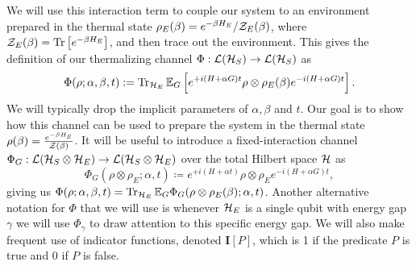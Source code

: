 We will use this interaction term to couple our system to an environment prepared in the thermal state $\rho_E(\beta) = e^{-\beta H_E} /\mathcal{Z}_E(\beta)$, where $\mathcal{Z}_E(\beta) = \operatorname{Tr} \left[  e^{-\beta H_E}  \right]$, and then trace out the environment. This gives the definition of our thermalizing channel $\Phi : \mathcal{L}(\mathcal{H}_S) \to \mathcal{L}(\mathcal{H}_S)$ as
\begin{equation}\label{eq:PhiDef}
    \Phi(\rho ; \alpha, \beta, t) :=  \operatorname{Tr}_{\mathcal{H}_E} \mathbb{E}_{G} \left[ e^{+i(H + \alpha G)t} \rho \otimes \rho_E(\beta) e^{-i(H + \alpha G) t}\right]. 
\end{equation}
We will typically drop the implicit parameters of $\alpha, \beta$ and $t$. Our goal is to show how this channel can be used to prepare the system in the thermal state $\rho(\beta) = \frac{e^{-\beta H_S}}{\mathcal{Z}(\beta)}$. It will be useful to introduce a fixed-interaction channel $\Phi_G : \mathcal{L}(\mathcal{H}_S \otimes \mathcal{H}_E) \to \mathcal{L}(\mathcal{H}_S \otimes \mathcal{H}_E)$ over the total Hilbert space $\mathcal{H}$ as 
\begin{equation}
    \Phi_G(\rho \otimes \rho_E; \alpha, t) \coloneqq e^{+i(H + \alpha t)} \rho \otimes \rho_E e^{- i(H + \alpha G)t}, \label{eq:phi_g_definition}
\end{equation}
giving us $\Phi(\rho; \alpha, \beta, t) = \operatorname{Tr}_{\mathcal{H}_E} \mathbb{E}_G \Phi_G(\rho \otimes \rho_E(\beta); \alpha, t)$. Another alternative notation for $\Phi$ that we will use is whenever $\mathcal{H}_E$ is a single qubit with energy gap $\gamma$ we will use $\Phi_\gamma$ to draw attention to this specific energy gap. We will also make frequent use of indicator functions, denoted $\mathbf{I}[P]$, which is 1 if the predicate $P$ is true and 0 if $P$ is false.

